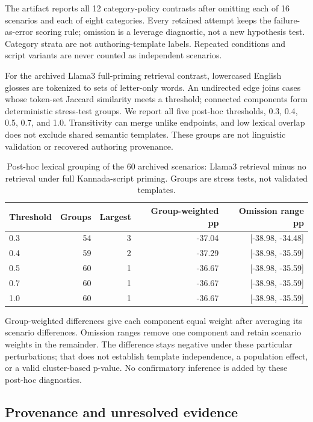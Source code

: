 \documentclass[manuscript,screen,review,anonymous]{acmart}
\begin{document}
The artifact reports all 12 category-policy contrasts after omitting each of 16 scenarios and each of eight categories. Every retained attempt keeps the failure-as-error scoring rule; omission is a leverage diagnostic, not a new hypothesis test. Category strata are not authoring-template labels. Repeated conditions and script variants are never counted as independent scenarios.

For the archived Llama3 full-priming retrieval contrast, lowercased English glosses are tokenized to sets of letter-only words. An undirected edge joins cases whose token-set Jaccard similarity meets a threshold; connected components form deterministic stress-test groups. We report all five post-hoc thresholds, 0.3, 0.4, 0.5, 0.7, and 1.0. Transitivity can merge unlike endpoints, and low lexical overlap does not exclude shared semantic templates. These groups are not linguistic validation or recovered authoring provenance.
\begin{table}[htbp]
\caption{Post-hoc lexical grouping of the 60 archived scenarios: Llama3 retrieval minus no retrieval under full Kannada-script priming. Groups are stress tests, not validated templates.}
\label{tab:lexical-stress}
\centering
\begin{tabular}{@{}lrrrr@{}}
\toprule
Threshold & Groups & Largest & Group-weighted pp & Omission range pp \\
\midrule
0.3 & 54 & 3 & -37.04 & [-38.98, -34.48] \\
0.4 & 59 & 2 & -37.29 & [-38.98, -35.59] \\
0.5 & 60 & 1 & -36.67 & [-38.98, -35.59] \\
0.7 & 60 & 1 & -36.67 & [-38.98, -35.59] \\
1.0 & 60 & 1 & -36.67 & [-38.98, -35.59] \\
\bottomrule
\end{tabular}
\end{table}

Group-weighted differences give each component equal weight after averaging its scenario differences. Omission ranges remove one component and retain scenario weights in the remainder. The difference stays negative under these particular perturbations; that does not establish template independence, a population effect, or a valid cluster-based p-value. No confirmatory inference is added by these post-hoc diagnostics.

\subsection{Provenance and unresolved evidence}
\end{document}
